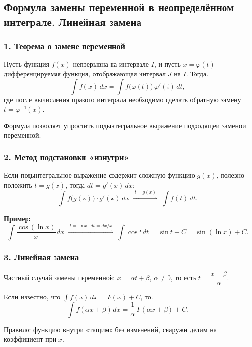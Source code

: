 \subsection{Формула замены переменной в неопределённом интеграле. Линейная замена}

\subsubsection*{1. Теорема о замене переменной}

\begin{theorem}
Пусть функция $f(x)$ непрерывна на интервале $I$, и пусть $x = \varphi(t)$ — дифференцируемая функция, отображающая интервал $J$ на $I$. Тогда:
\[ \int f(x)\,dx = \int f\bigl(\varphi(t)\bigr)\,\varphi'(t)\,dt, \]
где после вычисления правого интеграла необходимо сделать обратную замену $t = \varphi^{-1}(x)$.
\end{theorem}

Формула позволяет упростить подынтегральное выражение подходящей заменой переменной.

\subsubsection*{2. Метод подстановки «изнутри»}

Если подынтегральное выражение содержит сложную функцию $g(x)$, полезно положить $t = g(x)$, тогда $dt = g'(x)\,dx$:
\[
\int f\bigl(g(x)\bigr)\cdot g'(x)\,dx \;\xrightarrow{\;t=g(x)\;}\; \int f(t)\,dt.
\]

\textbf{Пример:}
\[
\int \frac{\cos(\ln x)}{x}\,dx \;\xrightarrow{\;t=\ln x,\; dt = dx/x\;}\;
\int \cos t\,dt = \sin t + C = \sin(\ln x) + C.
\]

\subsubsection*{3. Линейная замена}

Частный случай замены переменной: $x = \alpha t + \beta$, $\alpha \neq 0$, то есть $t = \dfrac{x - \beta}{\alpha}$.

\begin{theorem}
Если известно, что $\int f(x)\,dx = F(x) + C$, то:
\[ \int f(\alpha x + \beta)\,dx = \frac{1}{\alpha}\,F(\alpha x + \beta) + C. \]
\end{theorem}

Правило: функцию внутри «тащим» без изменений, снаружи делим на коэффициент при $x$.

